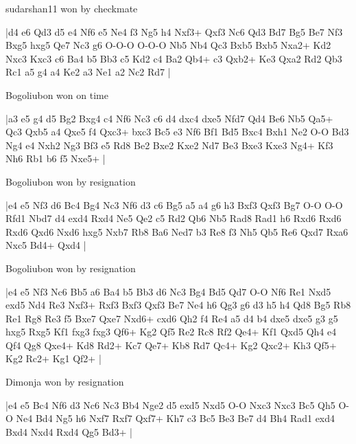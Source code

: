 \showboard

sudarshan11 won by checkmate

\makegametitle
|d4 e6 Qd3 d5 e4 Nf6 e5 Ne4 f3 Ng5 h4 Nxf3+ Qxf3 Nc6 Qd3 Bd7 Bg5 Be7 Nf3 Bxg5 hxg5 Qe7 Nc3 g6 O-O-O O-O-O Nb5 Nb4 Qc3 Bxb5 Bxb5 Nxa2+ Kd2 Nxc3 Kxc3 c6 Ba4 b5 Bb3 c5 Kd2 c4 Ba2 Qb4+ c3 Qxb2+ Ke3 Qxa2 Rd2 Qb3 Rc1 a5 g4 a4 Ke2 a3 Ne1 a2 Nc2 Rd7  |

\showboard

Bogoliubon won on time

\makegametitle
|a3 e5 g4 d5 Bg2 Bxg4 c4 Nf6 Nc3 c6 d4 dxc4 dxe5 Nfd7 Qd4 Be6 Nb5 Qa5+ Qc3 Qxb5 a4 Qxe5 f4 Qxc3+ bxc3 Bc5 e3 Nf6 Bf1 Bd5 Bxc4 Bxh1 Ne2 O-O Bd3 Ng4 e4 Nxh2 Ng3 Bf3 e5 Rd8 Be2 Bxe2 Kxe2 Nd7 Be3 Bxe3 Kxe3 Ng4+ Kf3 Nh6 Rb1 b6 f5 Nxe5+  |

\showboard

Bogoliubon won by resignation

\makegametitle
|e4 e5 Nf3 d6 Bc4 Bg4 Nc3 Nf6 d3 c6 Bg5 a5 a4 g6 h3 Bxf3 Qxf3 Bg7 O-O O-O Rfd1 Nbd7 d4 exd4 Rxd4 Ne5 Qe2 c5 Rd2 Qb6 Nb5 Rad8 Rad1 h6 Rxd6 Rxd6 Rxd6 Qxd6 Nxd6 hxg5 Nxb7 Rb8 Ba6 Ned7 b3 Re8 f3 Nh5 Qb5 Re6 Qxd7 Rxa6 Nxc5 Bd4+ Qxd4  |

\showboard

Bogoliubon won by resignation

\makegametitle
|e4 e5 Nf3 Nc6 Bb5 a6 Ba4 b5 Bb3 d6 Nc3 Bg4 Bd5 Qd7 O-O Nf6 Re1 Nxd5 exd5 Nd4 Re3 Nxf3+ Rxf3 Bxf3 Qxf3 Be7 Ne4 h6 Qg3 g6 d3 h5 h4 Qd8 Bg5 Rb8 Re1 Rg8 Re3 f5 Bxe7 Qxe7 Nxd6+ cxd6 Qh2 f4 Re4 a5 d4 b4 dxe5 dxe5 g3 g5 hxg5 Rxg5 Kf1 fxg3 fxg3 Qf6+ Kg2 Qf5 Re2 Rc8 Rf2 Qe4+ Kf1 Qxd5 Qh4 e4 Qf4 Qg8 Qxe4+ Kd8 Rd2+ Kc7 Qe7+ Kb8 Rd7 Qc4+ Kg2 Qxc2+ Kh3 Qf5+ Kg2 Rc2+ Kg1 Qf2+  |

\showboard

Dimonja won by resignation

\makegametitle
|e4 e5 Bc4 Nf6 d3 Nc6 Nc3 Bb4 Nge2 d5 exd5 Nxd5 O-O Nxc3 Nxc3 Bc5 Qh5 O-O Ne4 Bd4 Ng5 h6 Nxf7 Rxf7 Qxf7+ Kh7 c3 Bc5 Be3 Be7 d4 Bh4 Rad1 exd4 Bxd4 Nxd4 Rxd4 Qg5 Bd3+  |

\showboard

